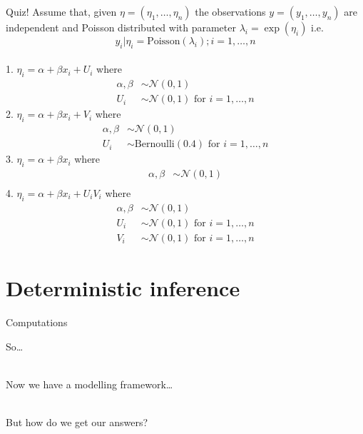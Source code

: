 \documentclass[
  ignorenonframetext,
]{beamer}
\begin{document}
\begin{frame}{Quiz!}
\protect\hypertarget{quiz}{}
Assume that, given \(\eta = (\eta_1,\dots,\eta_n)\) the observations
\(y = (y_1,\dots,y_n)\) are independent and Poisson distributed with
parameter \(\lambda_ i = \exp(\eta_i)\) i.e. \[
y_i|\eta_i =\text{Poisson}(\lambda_i); i = 1,\dots,n 
\]\\
\small 1. \(\eta_i=\alpha+\beta x_i+U_i\) where \[
\begin{aligned}
\alpha,\beta & \sim\mathcal{N}(0,1)\\
U_i & \sim \mathcal{N}(0,1) \text{ for } i = 1,\dots,n
\end{aligned}
\] 2. \(\eta_i=\alpha+\beta x_i+V_i\) where \[
\begin{aligned}
\alpha,\beta & \sim\mathcal{N}(0,1)\\
U_i & \sim \text{Bernoulli}(0.4) \text{ for } i = 1,\dots,n
\end{aligned}
\] 3. \(\eta_i=\alpha+\beta x_i\) where \[
\begin{aligned}
\alpha,\beta & \sim\mathcal{N}(0,1)\\
\end{aligned}
\] 4. \(\eta_i=\alpha+\beta x_i + U_iV_i\) where \[
\begin{aligned}
\alpha,\beta & \sim\mathcal{N}(0,1)\\
U_i & \sim \mathcal{N}(0,1) \text{ for } i = 1,\dots,n\\
V_i & \sim \mathcal{N}(0,1) \text{ for } i = 1,\dots,n
\end{aligned}
\] \normalsize
\end{frame}

\hypertarget{deterministic-inference}{%
\section{Deterministic inference}\label{deterministic-inference}}

\begin{frame}{Computations}
\protect\hypertarget{computations}{}
\Large

\hfill\break
\hfill\break
So\ldots{}\\
\strut \\
Now we have a modelling framework\ldots{}\\
\strut \\
But how do we get our answers? \normalsize
\end{frame}
\end{document}
